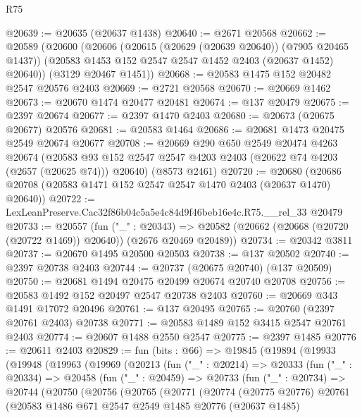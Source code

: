 \begin{lexlean}{R75}
\begin{coremodule}
@20639 := @20635 (@20637 @1438)
@20640 := @2671 @20568
@20662 := @20589
    (@20600
      (@20606
        (@20615 (@20629 (@20639 @20640)) (@7905 @20465 @1437))
        (@20583 @1453 @152 @2547 @2547 @1452 @2403 (@20637 @1452) @20640))
      (@3129 @20467 @1451))
@20668 := @20583 @1475 @152 @20482 @2547 @20576 @2403
@20669 := @2721 @20568
@20670 := @20669 @1462
@20673 := @20670 @1474 @20477 @20481
@20674 := @137 @20479
@20675 := @2397 @20674
@20677 := @2397 @1470 @2403
@20680 := @20673 (@20675 @20677) @20576
@20681 := @20583 @1464
@20686 := @20681 @1473 @20475 @2549 @20674 @20677
@20708 := @20669
    @290
    @650
    @2549
    @20474
    @4263
    @20674
    (@20583 @93 @152 @2547 @2547 @4203 @2403 (@20622 @74 @4203 (@2657 (@20625 @74))) @20640)
    (@8573 @2461)
@20720 := @20680 (@20686 @20708 (@20583 @1471 @152 @2547 @2547 @1470 @2403 (@20637 @1470) @20640))
@20722 := LexLeanPreserve.Cac32f86b04c5a5e4c84d9f46beb16e4c.R75.__rel_33 @20479
@20733 := @20557
    (fun ("_" : @20343) =>
    @20582 (@20662 (@20668 (@20720 (@20722 @1469)) @20640)) (@2676 @20469 @20489))
@20734 := @20342 @3811
@20737 := @20670 @1495 @20500 @20503
@20738 := @137 @20502
@20740 := @2397 @20738 @2403
@20744 := @20737 (@20675 @20740) (@137 @20509)
@20750 := @20681 @1494 @20475 @20499 @20674 @20740 @20708
@20756 := @20583 @1492 @152 @20497 @2547 @20738 @2403
@20760 := @20669 @343 @1491 @17072 @20496
@20761 := @137 @20495
@20765 := @20760 (@2397 @20761 @2403) @20738
@20771 := @20583 @1489 @152 @3415 @2547 @20761 @2403
@20774 := @20607 @1488 @2550 @2547
@20775 := @2397 @1485
@20776 := @20611 @2403
@20829 := fun (bits : @66) =>
  @19845
    (@19894
      (@19933
        (@19948
          (@19963
            (@19969
              (@20213
                (fun ("_" : @20214) =>
                @20333
                  (fun ("_" : @20334) =>
                  @20458
                    (fun ("_" : @20459) =>
                    @20733
                      (fun ("_" : @20734) =>
                      @20744
                        (@20750
                          (@20756
                            (@20765
                              (@20771
                                (@20774
                                  (@20775 @20776)
                                  @20761
                                  (@20583
                                    @1486
                                    @671
                                    @2547
                                    @2549
                                    @1485
                                    @20776
                                    (@20637 @1485)

\end{coremodule}
\end{lexlean}
